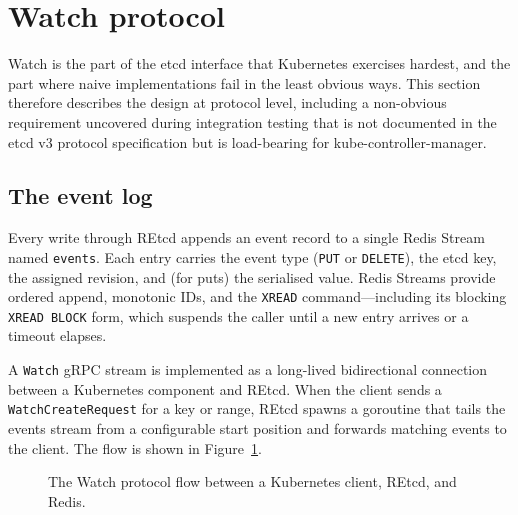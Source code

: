 \section{Watch protocol}
\label{sec:design-watch}

Watch is the part of the etcd interface that Kubernetes exercises hardest, and the part where naive implementations fail in the least obvious ways. This section therefore describes the design at protocol level, including a non-obvious requirement uncovered during integration testing that is not documented in the etcd v3 protocol specification but is load-bearing for kube-controller-manager.

\subsection{The event log}
\label{sec:design-watch-log}

Every write through REtcd appends an event record to a single Redis Stream named \texttt{events}. Each entry carries the event type (\texttt{PUT} or \texttt{DELETE}), the etcd key, the assigned revision, and (for puts) the serialised value. Redis Streams provide ordered append, monotonic IDs, and the \texttt{XREAD} command---including its blocking \texttt{XREAD BLOCK} form, which suspends the caller until a new entry arrives or a timeout elapses.

A \texttt{Watch} gRPC stream is implemented as a long-lived bidirectional connection between a Kubernetes component and REtcd. When the client sends a \texttt{WatchCreateRequest} for a key or range, REtcd spawns a goroutine that tails the events stream from a configurable start position and forwards matching events to the client. The flow is shown in Figure~\ref{fig:watch-seq}.

\begin{figure}[h]
    \centering
    \caption{The Watch protocol flow between a Kubernetes client, REtcd, and Redis.}
    \label{fig:watch-seq}
\end{figure}

